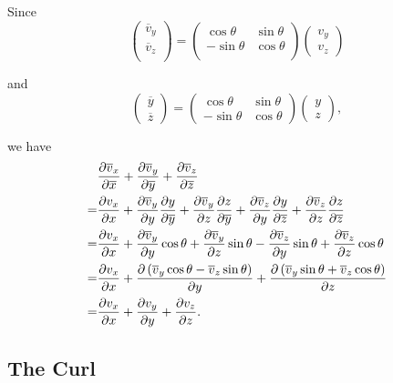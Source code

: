         \begin{sol}[1.17]
        Since
            \begin{equation}
                \begin{pmatrix}
                    \overline{v}_y \\
                    \overline{v}_z \\
                \end{pmatrix}
        = \begin{pmatrix}
            \cos \theta & \sin \theta\\
            -\sin\theta & \cos \theta\\
        \end{pmatrix}
        \begin{pmatrix}
            v_y \\ v_z
        \end{pmatrix}
    \end{equation}

    and
    \begin{equation}
        \begin{pmatrix}
            \overline{y} \\ \overline{z}
        \end{pmatrix}
        = \begin{pmatrix}
            \cos \theta & \sin \theta \\
            -\sin \theta & \cos \theta
        \end{pmatrix}
        \begin{pmatrix}
            y \\ z
        \end{pmatrix},
    \end {equation}

    we have
        \begin{equation}
            \begin{aligned}
                &\frac{\partial \overline{v}_x}{\partial \overline{x}} + \frac{\partial \overline{v}_y}{\partial \overline{y}} + \frac{\partial \overline{v}_z}{\partial \overline{z}} \\
                =&\frac{\partial v_x}{\partial x} + \frac{\partial \overline{v}_y}{\partial y}\frac{\partial y}{\partial \overline{y}} + \frac{\partial \overline{v}_y}{\partial z}\frac{\partial z}{\partial \overline{y}}
                    + \frac{\partial \overline{v}_z}{\partial y}\frac{\partial y}{\partial \overline{z}} + \frac{\partial \overline{v}_z}{\partial z}\frac{\partial z}{\partial \overline{z}} \\
                =&\frac{\partial v_x}{\partial x} + \frac{\partial \overline{v}_y}{\partial y}\cos \theta 
                    + \frac{\partial \overline{v}_y}{\partial z}\sin \theta - \frac{\partial \overline{v}_z}{\partial y} \sin \theta + \frac{\partial \overline{v}_z}{\partial z} \cos \theta \\
                =&\frac{\partial v_x}{\partial x}+\frac{\partial \left(\overline{v}_y\cos\theta - \overline{v}_z\sin\theta\right)}{\partial y} + \frac{\partial \left(\overline{v}_y\sin\theta + \overline{v}_z\cos\theta\right)}{\partial z} \\
                =&\frac{\partial v_x}{\partial x}+\frac{\partial v_y}{\partial y} + \frac{\partial v_z}{\partial z}.
            \end{aligned}
        \end{equation}
\end{sol}

\subsection{The Curl}

